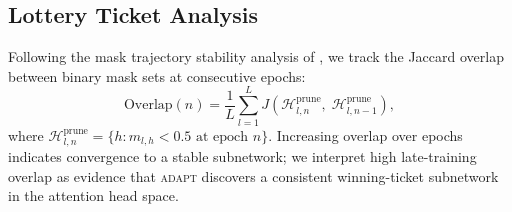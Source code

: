 \documentclass{article}
\newcommand{\system}{\textsc{adapt}}
\begin{document}
\begin{table}[t]
\centering
\caption{Ablation study on GSM8K. \emph{Acc.}\ = exact-match accuracy;
         \emph{Spar.}\ = mean head sparsity; \emph{Lat.}\ = mean latency.
         $\dagger$ = our primary configuration.}
\label{tab:ablation}
\end{table}

\subsection{Lottery Ticket Analysis}
\label{sec:analysis_lth}

Following the mask trajectory stability analysis of \citet{frankle2019lottery}, we track the
Jaccard overlap between binary mask sets at consecutive epochs:
\[
  \text{Overlap}(n) = \frac{1}{L}\sum_{l=1}^{L}
    J\!\left(\mathcal{H}^{\text{prune}}_{l,n},\; \mathcal{H}^{\text{prune}}_{l,n-1}\right),
\]
where $\mathcal{H}^{\text{prune}}_{l,n} = \{h : m_{l,h} < 0.5\text{ at epoch }n\}$.
Increasing overlap over epochs indicates convergence to a stable subnetwork; we interpret
high late-training overlap as evidence that \system{} discovers a consistent winning-ticket
subnetwork in the attention head space.
\end{document}

